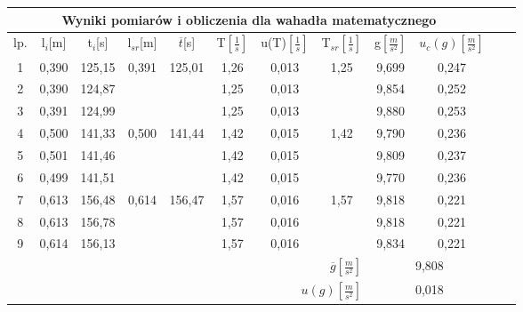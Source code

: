 \documentclass[12pt]{article}
\begin{document}
\begin{table}[!htbp]
    \centering
    \begin{adjustbox}{width=1\textwidth}
    \begin{tabular}{|c|c|c|c|c|c|c|c|c|c|c|c|}
    \hline
    \multicolumn{10}{|c|}{Wyniki pomiarów i obliczenia dla wahadła matematycznego} \\
    \hline
    lp. & l$_i$[m] & t$_i$[s] & l$_{sr}$[m] & $\overline{t}$[s] & T$\left[ \frac{1}{s} \right]$ & u(T)$\left[\frac{1}{s}\right]$ & T$_{sr}\left[ \frac{1}{s} \right]$ & g$\left[ \frac{m}{s^2} \right]$ & $u_c(g) \left[ \frac{m}{s^2} \right] $
    \\[10pt] \hline
    1 & 0,390 & 125,15 & 0,391 & 125,01 & 1,26 & 0,013 & 1,25 & 9,699 & 0,247\\
    2 & 0,390 & 124,87 & ~ & ~ & 1,25          & 0,013 & ~     & 9,854 & 0,252\\
    3 & 0,391 & 124,99 & ~ & ~ & 1,25          & 0,013 & ~     & 9,880 & 0,253\\ \hline
    4 & 0,500 & 141,33 & 0,500 & 141,44 & 1,42 & 0,015 & 1,42  & 9,790 & 0,236\\
    5 & 0,501 & 141,46 & ~ & ~ & 1,42          & 0,015 & ~     & 9,809 & 0,237\\
    6 & 0,499 & 141,51 & ~ & ~ & 1,42          & 0,015 & ~     & 9,770 & 0,236\\ \hline
    7 & 0,613 & 156,48 & 0,614 & 156,47 & 1,57 & 0,016 & 1,57  & 9,818 & 0,221\\
    8 & 0,613 & 156,78 & ~ & ~ & 1,57          & 0,016 & ~     & 9,818 & 0,221\\
    9 & 0,614 & 156,13 & ~ & ~ & 1,57          & 0,016 & ~     & 9,834 & 0,221\\ \hline
    \multicolumn{8}{|r|}{$\overline{g} \left[ \frac{m}{s^2} \right]$} & \multicolumn{2}{|c|}{9,808} \\ \hline
    \multicolumn{8}{|r|}{$u(g) \left[ \frac{m}{s^2} \right]$} & \multicolumn{2}{|c|}{0,018} \\ \hline
    \end{tabular}
\end{adjustbox}
\end{table}
\end{document}

